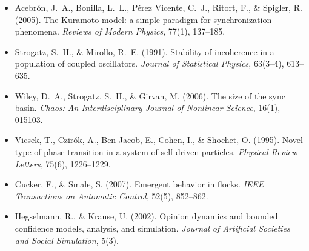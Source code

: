 \documentclass[11pt]{article}
\begin{document}
\begin{itemize}[leftmargin=*]
\item Acebr\'on, J.\ A., Bonilla, L.\ L., P\'erez Vicente, C.\ J., Ritort, F., \& Spigler, R. (2005). The Kuramoto model: a simple paradigm for synchronization phenomena. \emph{Reviews of Modern Physics}, 77(1), 137--185.
\item Strogatz, S.\ H., \& Mirollo, R.\ E. (1991). Stability of incoherence in a population of coupled oscillators. \emph{Journal of Statistical Physics}, 63(3--4), 613--635.
\item Wiley, D.\ A., Strogatz, S.\ H., \& Girvan, M. (2006). The size of the sync basin. \emph{Chaos: An Interdisciplinary Journal of Nonlinear Science}, 16(1), 015103.
\item Vicsek, T., Czir\'ok, A., Ben-Jacob, E., Cohen, I., \& Shochet, O. (1995). Novel type of phase transition in a system of self-driven particles. \emph{Physical Review Letters}, 75(6), 1226--1229.
\item Cucker, F., \& Smale, S. (2007). Emergent behavior in flocks. \emph{IEEE Transactions on Automatic Control}, 52(5), 852--862.
\item Hegselmann, R., \& Krause, U. (2002). Opinion dynamics and bounded confidence models, analysis, and simulation. \emph{Journal of Artificial Societies and Social Simulation}, 5(3).
\end{itemize}
\end{document}
